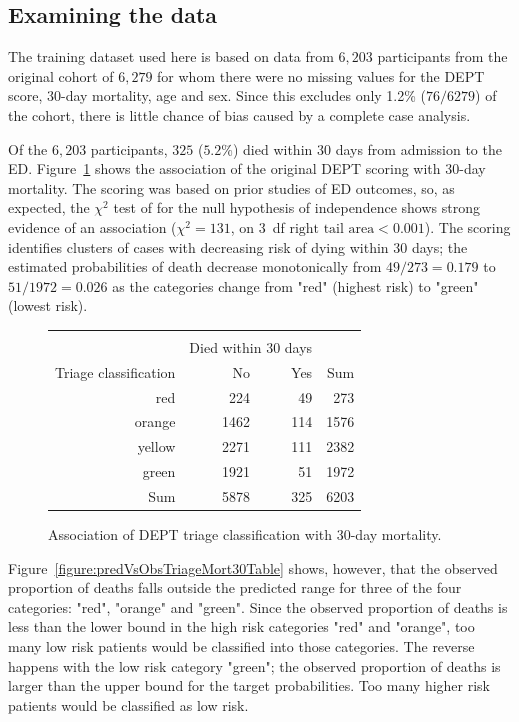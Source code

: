 \subsection{Examining the data}
\label{section:examiningDataDanishED}

The training dataset used here is based on data from $6,203$ participants from the original cohort of $6,279$ for whom there were no missing values for the DEPT score, 30-day mortality, age and sex.  Since this excludes only 1.2\% ($76/6279$) of the cohort, there is little chance of bias caused by a complete case analysis.  

Of the $6,203$ participants, $325$ ($5.2\%$) died within 30 days from admission to the ED.  Figure~\ref{figure:triageMort30Table} shows the association of the original DEPT scoring with 30-day mortality.   The scoring was based on prior studies of ED outcomes, so, as expected, the $\chi^2$ test of for the null hypothesis of independence shows strong evidence of an association ($\chi^2 = 131$, on 3~df $\text{right tail area} < 0.001$).  The scoring identifies clusters of cases with decreasing risk of dying within 30 days; the estimated probabilities of death decrease monotonically from $ 49/273 =  0.179$ to $ 51/1972 = 0.026$ as the categories change from "red" (highest risk) to "green" (lowest risk).

\begin{figure}[ht]
\centering
\begin{tabular}{rrrr}
  \hline \\
  & \multicolumn{2}{c}{Died within 30 days} & \\
Triage classification & No & Yes & Sum \\
  \hline
red & 224 & 49 & 273 \\
  orange & 1462 & 114 & 1576 \\
  yellow & 2271 & 111 & 2382 \\
  green & 1921 & 51 & 1972 \\
  Sum & 5878 & 325 & 6203 \\
   \hline
\end{tabular}
\caption{Association of DEPT triage classification with
       30-day mortality.}
\label{figure:triageMort30Table}
\end{figure}

Figure~\ref{figure:predVsObsTriageMort30Table} shows, however, that the observed proportion of deaths falls outside the predicted range for three of the four categories: "red", "orange" and "green".  Since the observed proportion of deaths is less than the lower bound in the high risk categories "red" and "orange", too many low risk patients would be classified into those categories.  The reverse happens with the low risk category "green"; the observed proportion of deaths is larger than the upper bound for the target probabilities.  Too many higher risk patients would be classified as low risk.


